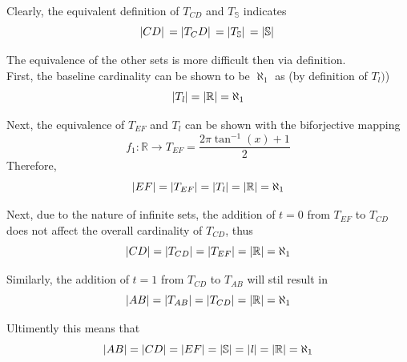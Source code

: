 \documentclass[]{article}
\newcommand{\R}{\mathbb{R}}
\begin{document}
Clearly, the equivalent definition of $T_{CD}$ and $T_{\mathbb{S}}$ indicates
$$\abs*{CD} = \abs*{T_CD} = \abs*{T_\mathbb{S}} = \abs*{\mathbb{S}}$$

The equivalence of the other sets is more difficult then via definition.\\
First, the baseline cardinality can be shown to be $\aleph_1$ as (by definition of $T_{\mathit{l}})$)
$$\abs{T_\mathit{l}} = \abs{\R} = \aleph_1$$

Next, the equivalence of $T_{EF}$ and $T_\mathit{l}$ can be shown with the biforjective mapping 
$$f_1 : \R \rightarrow T_{EF} = \frac{2 \pi \tan^{-1}(x) + 1}{2}$$
Therefore,
$$\abs{EF} = \abs{T_{EF}} = \abs{T_{\mathit{l}}} = \abs{\R} = \aleph_1$$

Next, due to the nature of infinite sets, the addition of $t=0$ from $T_{EF}$ to $T_{CD}$ 
does not affect the overall cardinality of $T_{CD}$, thus
$$\abs{CD} = \abs{T_{CD}} = \abs{T_{EF}} = \abs{\R} = \aleph_1$$

Similarly, the addition of $t=1$ from $T_{CD}$ to $T_{AB}$ will stil result in 
$$\abs{AB} = \abs{T_{AB}} = \abs{T_{CD}} = \abs{\R} = \aleph_1$$

Ultimently this means that
$$\abs{AB} = \abs{CD} = \abs{EF} = \abs{\mathbb{S}} = \abs{\mathit{l}} = \abs{\R} = \aleph_1$$
\end{document}
